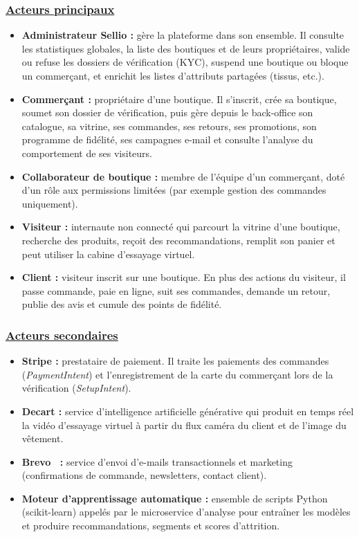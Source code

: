 \subsubsection*{\underline{\textbf{Acteurs principaux}}}
\begin{itemize}[label=]
\item \textbf{Administrateur Sellio :} gère la plateforme dans son ensemble. Il consulte les statistiques globales, la liste des boutiques et de leurs propriétaires, valide ou refuse les dossiers de vérification (KYC), suspend une boutique ou bloque un commerçant, et enrichit les listes d'attributs partagées (tissus, etc.).
\item \textbf{Commerçant :} propriétaire d'une boutique. Il s'inscrit, crée sa boutique, soumet son dossier de vérification, puis gère depuis le back-office son catalogue, sa vitrine, ses commandes, ses retours, ses promotions, son programme de fidélité, ses campagnes e-mail et consulte l'analyse du comportement de ses visiteurs.
\item \textbf{Collaborateur de boutique :} membre de l'équipe d'un commerçant, doté d'un rôle aux permissions limitées (par exemple gestion des commandes uniquement).
\item \textbf{Visiteur :} internaute non connecté qui parcourt la vitrine d'une boutique, recherche des produits, reçoit des recommandations, remplit son panier et peut utiliser la cabine d'essayage virtuel.
\item \textbf{Client :} visiteur inscrit sur une boutique. En plus des actions du visiteur, il passe commande, paie en ligne, suit ses commandes, demande un retour, publie des avis et cumule des points de fidélité.
\end{itemize}
\subsubsection*{\underline{\textbf{Acteurs secondaires}}}
\begin{itemize}[label=]
\item \textbf{Stripe :} prestataire de paiement. Il traite les paiements des commandes (\textit{PaymentIntent}) et l'enregistrement de la carte du commerçant lors de la vérification (\textit{SetupIntent}).
\item \textbf{Decart :} service d'intelligence artificielle générative qui produit en temps réel la vidéo d'essayage virtuel à partir du flux caméra du client et de l'image du vêtement.
\item \textbf{Brevo~\cite{brevo} :} service d'envoi d'e-mails transactionnels et marketing (confirmations de commande, newsletters, contact client).
\item \textbf{Moteur d'apprentissage automatique :} ensemble de scripts Python (scikit-learn) appelés par le microservice d'analyse pour entraîner les modèles et produire recommandations, segments et scores d'attrition.
\end{itemize}


